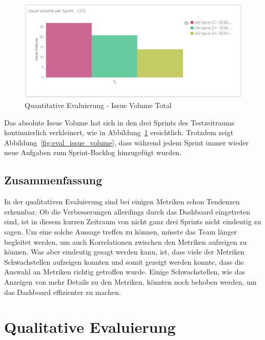 \begin{savenotes}
    \begin{figure}[H]
      \centering
      \includegraphics[width=1.0\textwidth]{img/eval-volume-total.png}
      \caption{Quantitative Evaluierung {-} Issue Volume Total}\label{fig:eval_issue_volume_total}
    \end{figure}
\end{savenotes}

Das absolute Issue Volume hat sich in den drei Sprints des Testzeitraums kontinuierlich verkleinert, wie in Abbildung~\ref{fig:eval_issue_volume_total} ersichtlich.
Trotzdem zeigt Abbildung~\ref{fig:eval_issue_volume}, dass während jedem Sprint immer wieder neue Aufgaben zum Sprint-Backlog hinzugefügt wurden.

\clearpage
\subsection*{Zusammenfassung}

In der qualitativen Evaluierung sind bei einigen Metriken schon Tendenzen erkennbar.
Ob die Verbesserungen allerdings durch das Dashboard eingetreten sind, ist in diesem kurzen Zeitraum von nicht ganz drei Sprints nicht eindeutig zu sagen.
Um eine solche Aussage treffen zu können, müsste das Team länger begleitet werden, um auch Korrelationen zwischen den Metriken aufzeigen zu können.
Was aber eindeutig gesagt werden kann, ist, dass viele der Metriken Schwachstellen aufzeigen konnten und somit gezeigt werden konnte, dass die Auswahl an Metriken richtig getroffen wurde.
Einige Schwachstellen, wie das Anzeigen von mehr Details zu den Metriken, könnten noch behoben werden, um das Dashboard effizienter zu machen.

\clearpage
\section{Qualitative Evaluierung}

